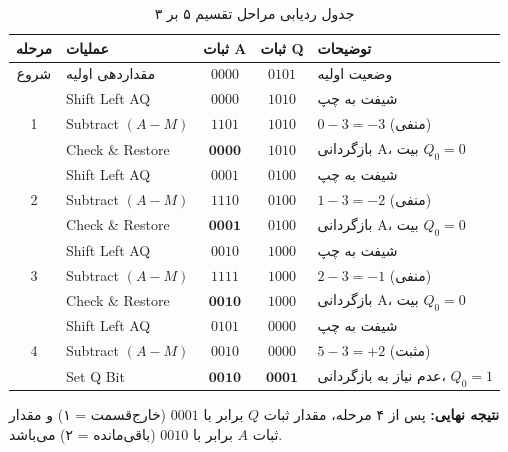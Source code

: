 \documentclass[12pt, a4paper]{article}
\begin{document}
\begin{table}[H]
\centering
\caption{جدول ردیابی مراحل تقسیم ۵ بر ۳}
\vspace{0.3cm}
\begin{tabular}{|c|l|c|c|l|}
\hline
\textbf{مرحله} & \textbf{عملیات} & \textbf{ثبات A} & \textbf{ثبات Q} & \textbf{توضیحات} \\
\hline
شروع & مقداردهی اولیه & $0000$ & $0101$ & وضعیت اولیه \\
\hline
 & Shift Left AQ & $0000$ & $1010$ & شیفت به چپ \\
1 & Subtract $(A-M)$ & $1101$ & $1010$ & $0 - 3 = -3$ (منفی) \\
 & Check \& Restore & $\mathbf{0000}$ & $1010$ & بازگردانی A، بیت $Q_0=0$ \\
\hline
 & Shift Left AQ & $0001$ & $0100$ & شیفت به چپ \\
2 & Subtract $(A-M)$ & $1110$ & $0100$ & $1 - 3 = -2$ (منفی) \\
 & Check \& Restore & $\mathbf{0001}$ & $0100$ & بازگردانی A، بیت $Q_0=0$ \\
\hline
 & Shift Left AQ & $0010$ & $1000$ & شیفت به چپ \\
3 & Subtract $(A-M)$ & $1111$ & $1000$ & $2 - 3 = -1$ (منفی) \\
 & Check \& Restore & $\mathbf{0010}$ & $1000$ & بازگردانی A، بیت $Q_0=0$ \\
\hline
 & Shift Left AQ & $0101$ & $0000$ & شیفت به چپ \\
4 & Subtract $(A-M)$ & $0010$ & $0000$ & $5 - 3 = +2$ (مثبت) \\
 & Set Q Bit & $\mathbf{0010}$ & $\mathbf{0001}$ & عدم نیاز به بازگردانی، $Q_0=1$ \\
\hline
\end{tabular}
\end{table}

\textbf{نتیجه نهایی:}
پس از ۴ مرحله، مقدار ثبات $Q$ برابر با $0001$ (خارج‌قسمت = ۱) و مقدار ثبات $A$ برابر با $0010$ (باقی‌مانده = ۲) می‌باشد.
\end{document}

